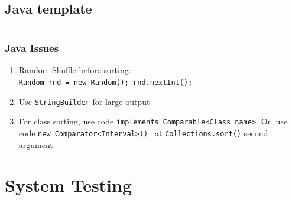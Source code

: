 \documentclass[10pt,oneside]{article}
\begin{document}
\begin{landscape}
\begin{multicols}{2}
% 




\subsection{Java template}
%
\inputminted{java}{contest_setup/Main.java}

\subsubsection{Java Issues}
{\normalsize
\begin{enumerate}
\item Random Shuffle before sorting:\\ \texttt{Random rnd = new Random(); rnd.nextInt();}
\item Use \texttt{StringBuilder} for large output
\item For class sorting, use code \texttt{implements Comparable<Class name>}. Or, use code \texttt{new Comparator<Interval>() {}} at \texttt{Collections.sort()} second argument
\end{enumerate}
}

\section{System Testing}


\end{multicols}
\end{landscape}
\end{document}
